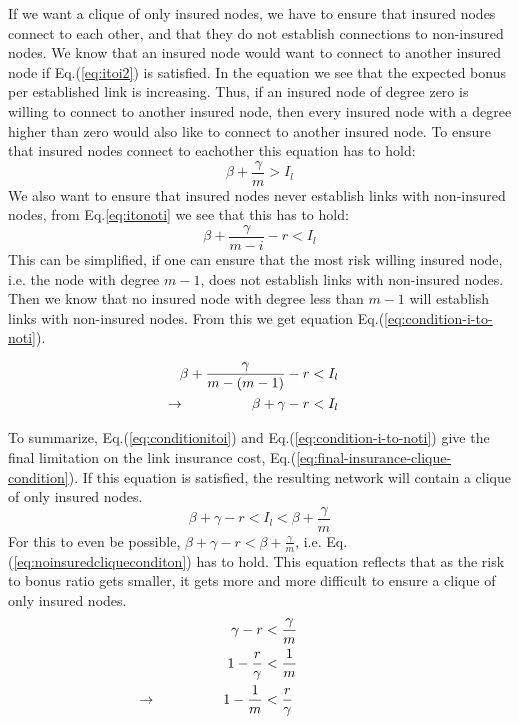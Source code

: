 If we want a clique of only insured nodes, we have to ensure that insured nodes connect to each other, and that they do not establish connections to non-insured nodes.
We know that an insured node would want to connect to another insured node if  Eq.(\ref{eq:itoi2}) is satisfied. 
In the equation we see that the expected bonus per established link is increasing. Thus, if an insured node of degree zero is willing to connect to another insured node, then every insured node with a degree higher than zero would also like to connect to another insured node. To ensure that insured nodes connect to eachother this equation has to hold:
\begin{equation}
\beta+\frac{\gamma}{m}>I_{l}
\label{eq:conditionitoi}
\end{equation}
We also want to ensure that insured nodes never establish links with non-insured nodes, from Eq.\ref{eq:itonoti} we see that this has to hold:
\begin{equation}
\beta+\frac{\gamma}{m-i}-r < I_{l}
\label{eq:conditionitonoti}
\end{equation}
This can be simplified, if one can ensure that the most risk willing insured node, i.e. the node with degree $m-1$, does not establish links with non-insured nodes. Then we know that no insured node with degree less than $m-1$ will establish links with non-insured nodes. From this we get equation Eq.(\ref{eq:condition-i-to-noti}).

\begin{eqnarray}
\beta+\frac{\gamma}{m-(m-1)}-r&<I_{l} \nonumber\\
\llap{$\rightarrow$\hspace{50pt}} \beta+\gamma-r&<I_{l}
\label{eq:condition-i-to-noti}
\end{eqnarray}

To summarize, Eq.(\ref{eq:conditionitoi}) and Eq.(\ref{eq:condition-i-to-noti}) give the final limitation on the link insurance cost, Eq.(\ref{eq:final-insurance-clique-condition}). If this equation is satisfied, the resulting network will contain a clique of only insured nodes.
\begin{equation}
\beta+\gamma-r<I_{l}<\beta+\frac{\gamma}{m}
\label{eq:final-insurance-clique-condition}
\end{equation}
For this to even be possible, $\beta+\gamma-r<\beta+\frac{\gamma}{m}$, i.e. Eq.(\ref{eq:noinsuredcliqueconditon}) has to hold. This equation reflects that as the risk to bonus ratio gets smaller, it gets more and more difficult to ensure a clique of only insured nodes. 
\begin{eqnarray}
\gamma-r &<\frac{\gamma}{m}\nonumber \\
1-\frac{r}{\gamma}&<\frac{1}{m} \nonumber \\
\llap{$\rightarrow$\hspace{50pt}}1-\frac{1}{m}&<\frac{r}{\gamma}
\label{eq:noinsuredcliqueconditon}
\end{eqnarray}


